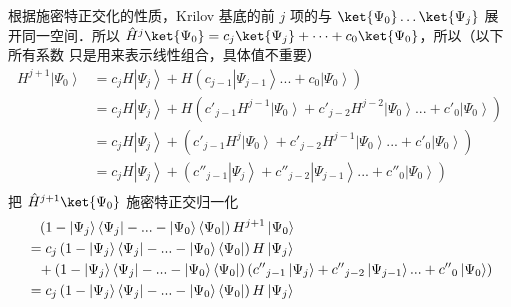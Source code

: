 根据施密特正交化的性质，Krilov 基底的前 $j$ 项的与 $\ket{\Psi_0}\dots\ket{\Psi_j}$ 展开同一空间．所以 $\hat H^j\ket{\Psi_0} = c_j\ket{\Psi_j} +\dots + c_0 \ket{\Psi_0}$，所以（以下所有系数 只是用来表示线性组合，具体值不重要）
\begin{equation}\begin{aligned}
  {H^{j + 1}}\left| {{\Psi_0}} \right\rangle  &= {c_j}H\left| {{\Psi_j}} \right\rangle  + H\left( {{c_{j - 1}}\left| {{\Psi_{j - 1}}} \right\rangle ... + {c_0}\left| {{\Psi_0}} \right\rangle } \right)  \\
   &= {c_j}H\left| {{\Psi_j}} \right\rangle  + H\left( {{{c'}_{j - 1}}{H^{j - 1}}\left| {{\Psi_0}} \right\rangle  + {{c'}_{j - 2}}{H^{j - 2}}\left| {{\Psi_0}} \right\rangle ... + {{c'}_0}\left| {{\Psi_0}} \right\rangle } \right)  \\
   &= {c_j}H\left| {{\Psi_j}} \right\rangle  + \left( {{{c'}_{j - 1}}{H^j}\left| {{\Psi_0}} \right\rangle  + {{c'}_{j - 2}}{H^{j - 1}}\left| {{\Psi_0}} \right\rangle ... + {{c'}_0}\left| {{\Psi_0}} \right\rangle } \right)  \\
   &= {c_j}H\left| {{\Psi_j}} \right\rangle  + \left( {{{c''}_{j - 1}}\left| {{\Psi_j}} \right\rangle  + {{c''}_{j - 2}}\left| {{\Psi_{j - 1}}} \right\rangle ... + {{c''}_0}\left| {{\Psi_0}} \right\rangle } \right)  \\ 
\end{aligned}\end{equation}
把 $\hat H^{j+1}\ket{\Psi_0}$ 施密特正交归一化
\begin{equation}
\begin{aligned}
&{\phantom{=}}\left( {1 - \left| {{\Psi_j}} \right\rangle \left\langle {{\Psi_j}} \right| - ... - \left| {{\Psi_0}} \right\rangle \left\langle {{\Psi_0}} \right|} \right){H^{j + 1}}\left| {{\Psi_0}} \right\rangle  \hfill \\
&= {c_j}\left( {1 - \left| {{\Psi_j}} \right\rangle \left\langle {{\Psi_j}} \right| - ... - \left| {{\Psi_0}} \right\rangle \left\langle {{\Psi_0}} \right|} \right)H\left| {{\Psi_j}} \right\rangle  \hfill \\
&{\phantom{=}}+ \left( {1 - \left| {{\Psi_j}} \right\rangle \left\langle {{\Psi_j}} \right| - ... - \left| {{\Psi_0}} \right\rangle \left\langle {{\Psi_0}} \right|} \right)\left( {{{c''}_{j - 1}}\left| {{\Psi_j}} \right\rangle  + {{c''}_{j - 2}}\left| {{\Psi_{j - 1}}} \right\rangle ... + {{c''}_0}\left| {{\Psi_0}} \right\rangle } \right) \hfill \\
&= {c_j}\left( {1 - \left| {{\Psi_j}} \right\rangle \left\langle {{\Psi_j}} \right| - ... - \left| {{\Psi_0}} \right\rangle \left\langle {{\Psi_0}} \right|} \right)H\left| {{\Psi_j}} \right\rangle  \hfill \\ 
\end{aligned}
\end{equation}


